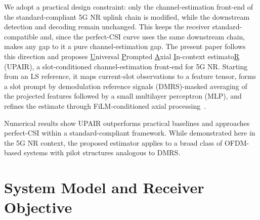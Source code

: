 \documentclass[conference,letterpaper]{IEEEtran}
\begin{document}
	We adopt a practical design constraint: only the channel-estimation front-end of the standard-compliant 5G NR uplink chain is modified, while the downstream detection and decoding remain unchanged. This keeps the receiver standard-compatible and, since the perfect-CSI curve uses the same downstream chain, makes any gap to it a pure channel-estimation gap. The present paper follows this direction and proposes \underline{U}niversal \underline{P}rompted \underline{A}xial \underline{I}n-context estimato\underline{R} (UPAIR{}), a slot-conditioned channel-estimation front-end for 5G NR. Starting from an LS reference, it maps current-slot observations to a feature tensor, forms a slot prompt by demodulation reference signals (DMRS)-masked averaging of the projected features followed by a small multilayer perceptron (MLP), and refines the estimate through FiLM-conditioned axial processing~\cite{film,axial}. 
	
	Numerical results show UPAIR outperforms practical baselines and approaches perfect-CSI within a standard-compliant framework. While demonstrated here in the 5G NR context, the proposed estimator applies to a broad class of OFDM-based systems with pilot structures analogous to DMRS.
	
	\section{System Model and Receiver Objective}
	\label{sec:system_model}
	
\end{document}
